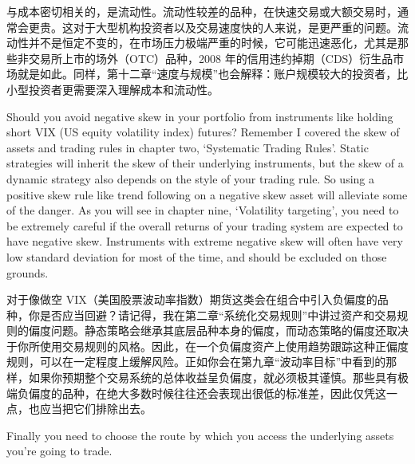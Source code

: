 \begin{chineseblock}与成本密切相关的，是流动性。流动性较差的品种，在快速交易或大额交易时，通常会更贵。这对于大型机构投资者以及交易速度快的人来说，是更严重的问题。流动性并不是恒定不变的，在市场压力极端严重的时候，它可能迅速恶化，尤其是那些非交易所上市的场外（OTC）品种，2008 年的信用违约掉期（CDS）衍生品市场就是如此。同样，第十二章“速度与规模”也会解释：账户规模较大的投资者，比小型投资者更需要深入理解成本和流动性。\end{chineseblock}


\begin{englishblock} Should you avoid negative skew in your portfolio from instruments like holding short VIX (US equity volatility index) futures? Remember I covered the skew of assets and trading rules in chapter two, ‘Systematic Trading Rules'. Static strategies will inherit the skew of their underlying instruments, but the skew of a dynamic strategy also depends on the style of your trading rule. So using a positive skew rule like trend following on a negative skew asset will alleviate some of the danger. As you will see in chapter nine, ‘Volatility targeting', you need to be extremely careful if the overall returns of your trading system are expected to have negative skew. Instruments with extreme negative skew will often have very low standard deviation for most of the time, and should be excluded on those grounds. \end{englishblock}

\begin{chineseblock}对于像做空 VIX（美国股票波动率指数）期货这类会在组合中引入负偏度的品种，你是否应当回避？请记得，我在第二章“系统化交易规则”中讲过资产和交易规则的偏度问题。静态策略会继承其底层品种本身的偏度，而动态策略的偏度还取决于你所使用交易规则的风格。因此，在一个负偏度资产上使用趋势跟踪这种正偏度规则，可以在一定程度上缓解风险。正如你会在第九章“波动率目标”中看到的那样，如果你预期整个交易系统的总体收益呈负偏度，就必须极其谨慎。那些具有极端负偏度的品种，在绝大多数时候往往还会表现出很低的标准差，因此仅凭这一点，也应当把它们排除出去。\end{chineseblock}


\begin{englishblock} Finally you need to choose the route by which you access the underlying assets you're going to trade. \end{englishblock}

